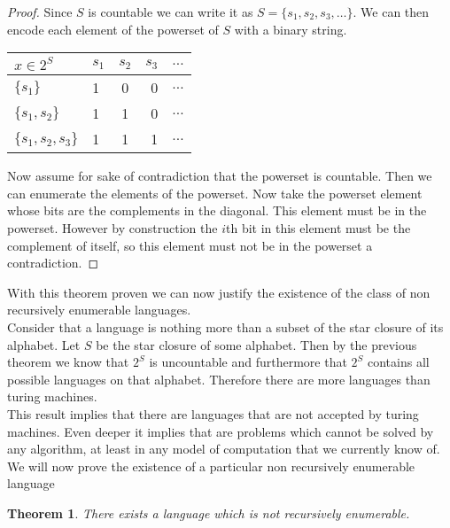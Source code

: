 \documentclass[11pt]{exam}
\newtheorem{theorem}{Theorem}[section]
\begin{document}
\begin{proof}
Since $S$ is countable we can write it as $S = \{s_1,s_2,s_3,\dots\}$. We can then encode each element of the powerset of $S$ with a binary string.

\begin{center}
\begin{tabular}{l | l c r r}
$x \in 2^S$ & $s_1$ & $s_2$ & $s_3$ & $\dots$\\ 
\hline
$\{s_1\}$ & 1 & 0 &0 & $\dots$\\ 
$\{s_1,s_2\}$ & 1 & 1 & 0 & $\dots$\\
$\{s_1,s_2,s_3\}$ & 1 &1 & 1  & $\dots$\\
\end{tabular}
\end{center}


Now assume for sake of contradiction that the powerset is countable. Then we can enumerate the elements of the powerset. Now take the powerset element whose bits are the complements in the diagonal. This element must be in the powerset. However by construction the $i$th bit in this element must be the complement of itself, so this element must not be in the powerset a contradiction.
\end{proof}

With this theorem proven we can now justify the existence of the class of non recursively enumerable languages.\\

Consider that a language is nothing more than a subset of the star closure of its alphabet. Let $S$ be the star closure of some alphabet. Then by the previous theorem we know that $2^S$ is uncountable and furthermore that $2^S$ contains all possible languages on that alphabet. Therefore there are more languages than turing machines.\\

This result implies that there are languages that are not accepted by turing machines. Even deeper it implies that are problems which cannot be solved by any algorithm, at least in any model of computation that we currently know of.\\


We will now prove the existence of a particular non recursively enumerable language\\

\begin{theorem}
There exists a language which is not recursively enumerable.
\end{theorem}
\end{document}
